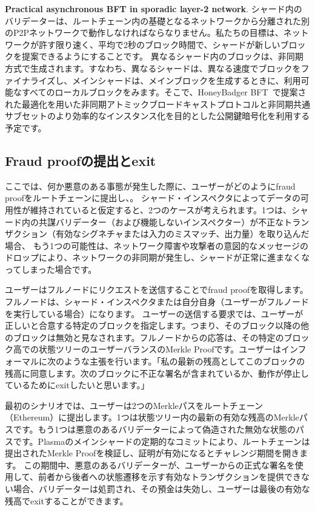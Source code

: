 \textbf{Practical asynchronous BFT in sporadic layer-2 network}.
シャード内のバリデーターは、ルートチェーン内の基礎となるネットワークから分離された別のP2Pネットワークで動作しなければならなりません。私たちの目標は、ネットワークが許す限り速く、平均で2秒のブロック時間で、シャードが新しいブロックを提案できるようにすることです。 異なるシャード内のブロックは、非同期方式で生成されます。すなわち、異なるシャードは、異なる速度でブロックをファイナライズし、メインシャードは、メインブロックを生成するときに、利用可能なすべてのローカルブロックをみます。そこで、HoneyBadger BFT~\cite{honeybadger}で提案された最適化を用いた非同期アトミックブロードキャストプロトコルと非同期共通サブセットのより効率的なインスタンス化を目的とした公開鍵暗号化を利用する予定です。

\subsection{Fraud proofの提出とexit}
ここでは、何か悪意のある事態が発生した際に、ユーザーがどのようにfraud proofをルートチェーンに提出し、。 シャード・インスペクタによってデータの可用性が維持されていると仮定すると、2つのケースが考えられます。1つは、シャード内の共謀バリデーター（および機能しないインスペクター）が不正なトランザクション（有効なシグネチャまたは入力のミスマッチ、出力量）を取り込んだ場合、 もう1つの可能性は、ネットワーク障害や攻撃者の意図的なメッセージのドロップにより、ネットワークの非同期が発生し、シャードが正常に進まなくなってしまった場合です。

ユーザーはフルノードにリクエストを送信することでfraud proofを取得します。フルノードは、シャード・インスペクタまたは自分自身（ユーザーがフルノードを実行している場合）になります。 ユーザーの送信する要求では、ユーザーが正しいと合意する特定のブロックを指定します。つまり、そのブロック以降の他のブロックは無効と見なされます。フルノードからの応答は、その特定のブロック高での状態ツリーのユーザーバランスのMerkle Proofです。ユーザーはインフォーマルに次のような主張を行います。「私の最新の残高としてこのブロックの残高に同意します。次のブロックに不正な署名が含まれているか、動作が停止しているためにexitしたいと思います。」

最初のシナリオでは、ユーザーは2つのMerkleパスをルートチェーン（Ethereum）に提出します。1つは状態ツリー内の最新の有効な残高のMerkleパスです。もう1つは悪意のあるバリデーターによって偽造された無効な状態のパスです。Plasmaのメインシャードの定期的なコミットにより、ルートチェーンは提出されたMerkle Proofを検証し、証明が有効になるとチャレンジ期間を開きます。 この期間中、悪意のあるバリデーターが、ユーザーからの正式な署名を使用して、前者から後者への状態遷移を示す有効なトランザクションを提供できない場合、バリデーターは処罰され、その預金は失効し、ユーザーは最後の有効な残高でexitすることができます。

